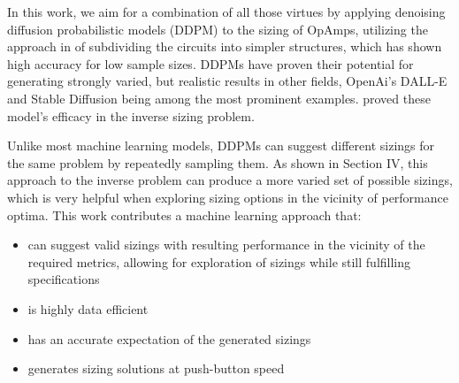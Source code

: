 \documentclass[conference]{IEEEtran}
\begin{document}
	In this work, we aim for a combination of all those virtues by applying denoising diffusion probabilistic models (DDPM) to the sizing of OpAmps, utilizing the approach in \cite{leibl24inverse} of subdividing the circuits into simpler structures, which has shown high accuracy for low sample sizes. DDPMs have proven their potential for generating strongly varied, but realistic results in other fields, OpenAi's DALL-E and Stable Diffusion being among the most prominent examples. \cite{eid24diffusion} proved these model's efficacy in the inverse sizing problem.
	
	Unlike most machine learning models, DDPMs can suggest different sizings for the same problem by repeatedly sampling them.
	As shown in Section IV, this approach to the inverse problem can produce a more varied set of possible sizings, which is very helpful when exploring sizing options in the vicinity of performance optima. 
This work contributes a machine learning approach that:
	\begin{itemize}
	\item can suggest valid sizings with resulting performance in the vicinity of the required metrics, allowing for exploration of sizings while still fulfilling specifications
	\item is highly data efficient
	\item has an accurate expectation of the generated sizings
	\item generates sizing solutions at push-button speed
	\end{itemize}
	
\end{document}
